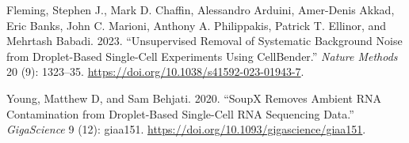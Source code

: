 \documentclass[
  letterpaper,
  DIV=11,
  numbers=noendperiod]{scrartcl}
\newlength{\cslhangindent}
\newenvironment{CSLReferences}[2] %
 {\begin{list}{}{%
  \setlength{\itemindent}{0pt}
  \setlength{\leftmargin}{0pt}
  \setlength{\parsep}{0pt}
  \ifodd #1
   \setlength{\leftmargin}{\cslhangindent}
   \setlength{\itemindent}{-1\cslhangindent}
  \fi
  \setlength{\itemsep}{#2\baselineskip}}}
 {\end{list}}
\begin{document}
\label{refs}
\begin{CSLReferences}{1}{0}
Fleming, Stephen J., Mark D. Chaffin, Alessandro Arduini, Amer-Denis
Akkad, Eric Banks, John C. Marioni, Anthony A. Philippakis, Patrick T.
Ellinor, and Mehrtash Babadi. 2023. {``Unsupervised Removal of
Systematic Background Noise from Droplet-Based Single-Cell Experiments
Using {CellBender}.''} \emph{Nature Methods} 20 (9): 1323--35.
\url{https://doi.org/10.1038/s41592-023-01943-7}.

Young, Matthew D, and Sam Behjati. 2020. {``{SoupX} Removes Ambient
{RNA} Contamination from Droplet-Based Single-Cell {RNA} Sequencing
Data.''} \emph{GigaScience} 9 (12): giaa151.
\url{https://doi.org/10.1093/gigascience/giaa151}.

\end{CSLReferences}
\end{document}
